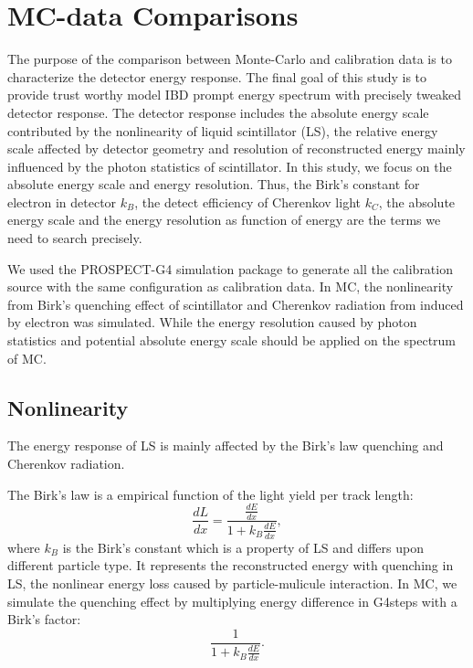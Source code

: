 \section{MC-data Comparisons}
The purpose of the comparison between Monte-Carlo and calibration data is to characterize the detector energy response. The final goal of this study is to provide trust worthy model IBD prompt energy spectrum with precisely tweaked detector response. The detector response includes the absolute energy scale contributed by the nonlinearity of liquid scintillator (LS), the relative energy scale affected by detector geometry and resolution of reconstructed energy mainly influenced by the photon statistics of scintillator. In this study, we focus on the absolute energy scale and energy resolution. Thus, the Birk’s constant for electron in detector $k_B$, the detect efficiency of Cherenkov light $k_{C}$, the absolute energy scale and the energy resolution as function of energy are the terms we need to search precisely.

We used the PROSPECT-G4 simulation package to generate all the calibration source with the same configuration as calibration data. In MC, the nonlinearity from Birk’s quenching effect of scintillator and Cherenkov radiation from induced by electron was simulated. While the energy resolution caused by photon statistics and potential absolute energy scale should be applied on the spectrum of MC. 

\subsection{Nonlinearity}
The energy response of LS is mainly affected by the Birk’s law quenching and Cherenkov radiation. 

The Birk’s law is a empirical function of the light yield per track length:
\begin{equation}
    \frac{dL}{dx} = \frac{\frac{dE}{dx}}{1+k_B\frac{dE}{dx}},
\end{equation}
where $k_B$ is the Birk's constant which is a property of LS and differs upon different particle type. It represents the reconstructed energy with quenching in LS, the nonlinear energy loss caused by particle-mulicule interaction. In MC, we  simulate the quenching effect by multiplying energy difference in G4steps with a Birk's factor:
\begin{equation}
   \frac{1}{1+k_B\frac{dE}{dx}}.
   \label{eql:birks}
\end{equation}

